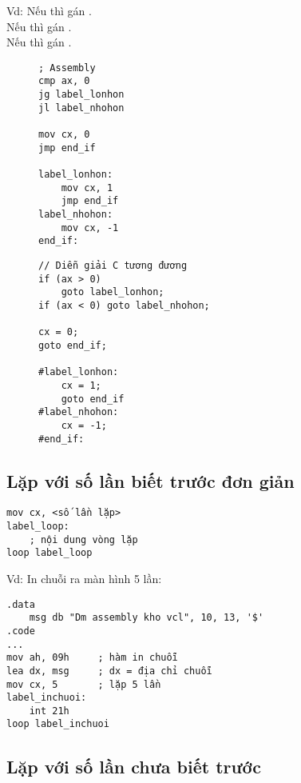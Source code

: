 \documentclass[main.tex]{subfiles}
\begin{document}
Vd: Nếu  thì gán .\\
Nếu  thì gán .\\
Nếu  thì gán .
\begin{figure}[H]
\begin{minipage}{0.5\textwidth}
\begin{verbatim}
; Assembly
cmp ax, 0 
jg label_lonhon
jl label_nhohon

mov cx, 0
jmp end_if 

label_lonhon:
    mov cx, 1
    jmp end_if
label_nhohon:
    mov cx, -1
end_if:
\end{verbatim}
\end{minipage}
\hfill
\begin{minipage}{0.4\textwidth}
\begin{verbatim}
// Diễn giải C tương đương 
if (ax > 0)
    goto label_lonhon;
if (ax < 0) goto label_nhohon;

cx = 0;
goto end_if;

#label_lonhon:
    cx = 1;
    goto end_if 
#label_nhohon:
    cx = -1;
#end_if:
\end{verbatim}
\end{minipage}
\end{figure}
\subsection{Lặp với số lần biết trước  đơn giản} \label{subsec:for}
\begin{verbatim}
mov cx, <số lần lặp>
label_loop:
    ; nội dung vòng lặp 
loop label_loop
\end{verbatim}
Vd: In chuỗi  ra màn hình 5 lần:
\begin{verbatim}
.data
    msg db "Dm assembly kho vcl", 10, 13, '$'
.code 
... 
mov ah, 09h     ; hàm in chuỗi  
lea dx, msg     ; dx = địa chỉ chuỗi 
mov cx, 5       ; lặp 5 lần 
label_inchuoi:
    int 21h 
loop label_inchuoi
\end{verbatim}
\subsection{Lặp với số lần chưa biết trước }
\begin{figure}[H]
\centering
{}
\end{figure}
\end{document}
